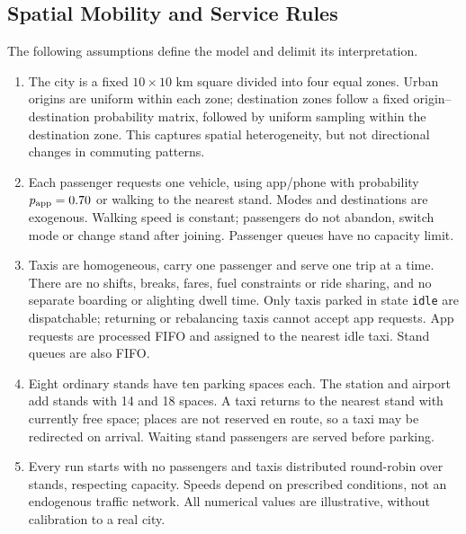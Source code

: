 \documentclass[10pt,twocolumn,letterpaper]{article}
\begin{document}
\subsection{Spatial Mobility and Service Rules}
The following assumptions define the model and delimit its interpretation.
\begin{enumerate}
\setlength{\itemsep}{1pt}\setlength{\topsep}{2pt}
\item The city is a fixed $10\times10$ km square divided into four equal zones.
Urban origins are uniform within each zone; destination zones follow a fixed
origin--destination probability matrix, followed by uniform sampling within
the destination zone. This captures spatial heterogeneity, but not directional
changes in commuting patterns.
\item Each passenger requests one vehicle, using app/phone with probability
$p_{\rm app}=0.70$ or walking to the nearest stand. Modes and destinations are
exogenous. Walking speed is constant; passengers do not abandon, switch mode
or change stand after joining. Passenger queues have no capacity limit.
\item Taxis are homogeneous, carry one passenger and serve one trip at a time.
There are no shifts, breaks, fares, fuel constraints or ride sharing, and no
separate boarding or alighting dwell time. Only taxis
parked in state \texttt{idle} are dispatchable; returning or rebalancing taxis
cannot accept app requests. App requests are processed FIFO and assigned to
the nearest idle taxi. Stand queues are also FIFO.
\item Eight ordinary stands have ten parking spaces each. The station and
airport add stands with 14 and 18 spaces. A taxi returns to the nearest stand
with currently free space; places are not reserved en route, so a taxi may be
redirected on arrival. Waiting stand passengers are served before parking.
\item Every run starts with no passengers and taxis distributed round-robin
over stands, respecting capacity. Speeds depend on prescribed conditions,
not an endogenous traffic network. All numerical values are illustrative,
without calibration to a real city.
\end{enumerate}
\end{document}
